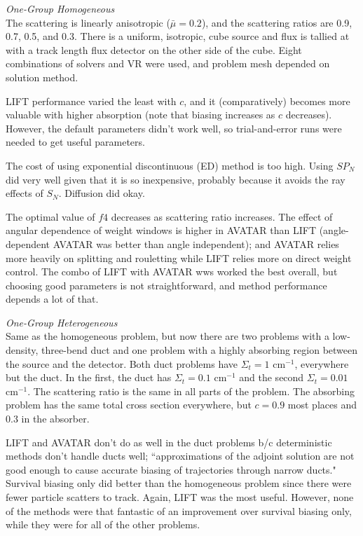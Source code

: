 \documentclass[12pt,twoside]{article}
\begin{document}
\noindent \textit{One-Group Homogeneous}\\
The scattering is linearly anisotropic ($\bar{\mu} = 0.2$), and the scattering ratios are 0.9, 0.7, 0.5, and 0.3. There is a uniform, isotropic, cube source and flux is tallied at with a track length flux detector on the other side of the cube. Eight combinations of solvers and VR were used, and problem mesh depended on solution method. 

LIFT performance varied the least with $c$, and it (comparatively) becomes more valuable with higher absorption (note that biasing increases as $c$ decreases). However, the default parameters didn't work well, so trial-and-error runs were needed to get useful parameters.

The cost of using exponential discontinuous (ED) method is too high. Using $SP_N$ did very well given that it is so inexpensive, probably because it avoids the ray effects of $S_N$. Diffusion did okay. 

The optimal value of $f4$ decreases as scattering ratio increases. The effect of angular dependence of weight windows is higher in AVATAR than LIFT (angle-dependent AVATAR was better than angle independent); and AVATAR relies more heavily on splitting and rouletting while LIFT relies more on direct weight control. The combo of LIFT with AVATAR wws worked the best overall, but choosing good parameters is not straightforward, and method performance depends a lot of that. 

\vspace*{1em}
\noindent \textit{One-Group Heterogeneous}\\
Same as the homogeneous problem, but now there are two problems with a low-density, three-bend duct and one problem with a highly absorbing region between the source and the detector. Both duct problems have $\Sigma_t = 1$ cm$^{-1}$, everywhere but the duct. In the first, the duct has $\Sigma_t = 0.1$ cm$^{-1}$ and the second $\Sigma_t = 0.01$ cm$^{-1}$. The scattering ratio is the same in all parts of the problem. The absorbing problem has the same total cross section everywhere, but $c=0.9$ most places and $0.3$ in the absorber. 

LIFT and AVATAR don't do as well in the duct problems b/c deterministic methods don't handle ducts well; ``approximations of the adjoint solution are not good enough to cause accurate biasing of trajectories through narrow ducts." Survival biasing only did better than the homogeneous problem since there were fewer particle scatters to track. Again, LIFT was the most useful. However, none of the methods were that fantastic of an improvement over survival biasing only, while they were for all of the other problems.
\end{document}
